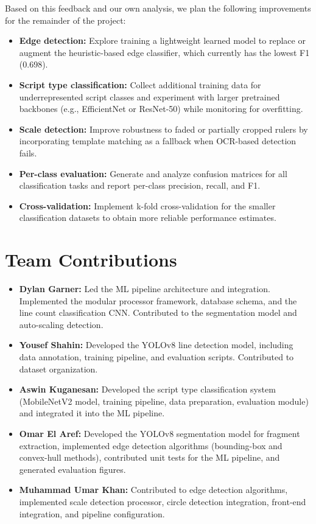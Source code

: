 \documentclass[11pt]{article}
\begin{document}
Based on this feedback and our own analysis, we plan the following improvements for the remainder of the project:

\begin{itemize}
  \item \textbf{Edge detection:} Explore training a lightweight learned model to replace or augment the heuristic-based edge classifier, which currently has the lowest F1 (0.698).
  \item \textbf{Script type classification:} Collect additional training data for underrepresented script classes and experiment with larger pretrained backbones (e.g., EfficientNet or ResNet-50) while monitoring for overfitting.
  \item \textbf{Scale detection:} Improve robustness to faded or partially cropped rulers by incorporating template matching as a fallback when OCR-based detection fails.
  \item \textbf{Per-class evaluation:} Generate and analyze confusion matrices for all classification tasks and report per-class precision, recall, and F1.
  \item \textbf{Cross-validation:} Implement k-fold cross-validation for the smaller classification datasets to obtain more reliable performance estimates.
\end{itemize}

\section*{Team Contributions}

\begin{itemize}
  \item \textbf{Dylan Garner:} Led the ML pipeline architecture and integration.  Implemented the modular processor framework, database schema, and the line count classification CNN.  Contributed to the segmentation model and auto-scaling detection.
  \item \textbf{Yousef Shahin:} Developed the YOLOv8 line detection model, including data annotation, training pipeline, and evaluation scripts.  Contributed to dataset organization.
  \item \textbf{Aswin Kuganesan:} Developed the script type classification system (MobileNetV2 model, training pipeline, data preparation, evaluation module) and integrated it into the ML pipeline.
  \item \textbf{Omar El Aref:} Developed the YOLOv8 segmentation model for fragment extraction, implemented edge detection algorithms (bounding-box and convex-hull methods), contributed unit tests for the ML pipeline, and generated evaluation figures.
  \item \textbf{Muhammad Umar Khan:} Contributed to edge detection algorithms, implemented scale detection processor, circle detection integration, front-end integration, and pipeline configuration.
\end{itemize}


\end{document}
